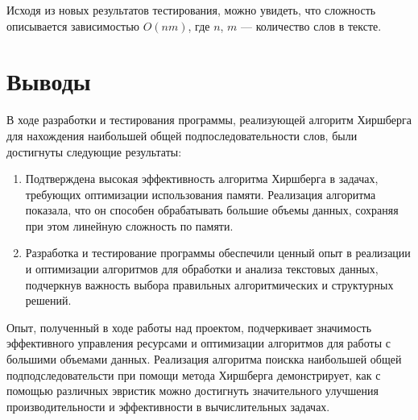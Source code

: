 \documentclass[12pt]{article}
\begin{document}

Исходя из новых результатов тестирования, можно увидеть, что сложность описывается зависимостью $O(nm)$, где 
$n$, $m$ — количество слов в тексте.


\section{Выводы}

В ходе разработки и тестирования программы, реализующей алгоритм Хиршберга для нахождения наибольшей общей подпоследовательности слов, были достигнуты следующие результаты:

\begin{enumerate}
    \item Подтверждена высокая эффективность алгоритма Хиршберга в задачах, требующих оптимизации использования памяти. Реализация алгоритма показала, что он способен обрабатывать большие объемы данных, сохраняя при этом линейную сложность по памяти.
    \item Разработка и тестирование программы обеспечили ценный опыт в реализации и оптимизации алгоритмов для обработки и анализа текстовых данных, подчеркнув важность выбора правильных алгоритмических и структурных решений.
\end{enumerate}

Опыт, полученный в ходе работы над проектом, подчеркивает значимость эффективного управления ресурсами и оптимизации алгоритмов для работы с большими объемами данных. Реализация алгоритма поискка наибольшей общей подподследовательсти при помощи метода Хиршберга демонстрирует, как с помощью различных эвристик можно достигнуть значительного улучшения производительности и эффективности в вычислительных задачах.
\end{document}
